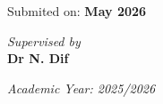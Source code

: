 \begin{titlepage}
\vspace{0.2cm}

{\normalsize Submited on: \textbf{May 2026}}\\

\vspace{0.6cm}

{\textit{Supervised by}}\\

\vspace{0.2cm}
{\normalsize \textbf{Dr N. Dif}}\\

\vspace{0.5cm}

\normalsize \textit{Academic Year: 2025/2026}

\end{titlepage}
